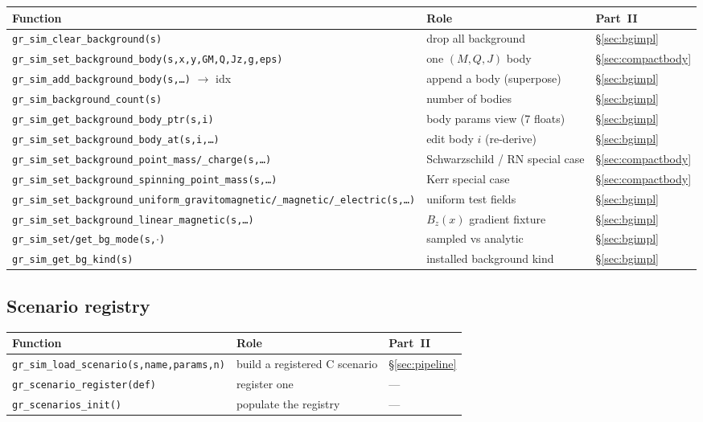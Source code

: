 \documentclass[11pt]{article}
\begin{document}
\nopagebreak
{\footnotesize
\begin{tabular}{@{}F{8.2cm}L{4.9cm}L{1.4cm}@{}}
\toprule
\textbf{Function} & \textbf{Role} & \textbf{Part~II} \\
\midrule
\texttt{gr\_sim\_clear\_background(s)} & drop all background & \S\ref{sec:bgimpl} \\
\texttt{gr\_sim\_set\_background\_body(s,x,y,GM,Q,Jz,g,eps)} & one $(M,Q,J)$ body & \S\ref{sec:compactbody} \\
\texttt{gr\_sim\_add\_background\_body(s,\dots)} $\to$ idx & append a body (superpose) & \S\ref{sec:bgimpl} \\
\texttt{gr\_sim\_background\_count(s)} & number of bodies & \S\ref{sec:bgimpl} \\
\texttt{gr\_sim\_get\_background\_body\_ptr(s,i)} & body params view (7 floats) & \S\ref{sec:bgimpl} \\
\texttt{gr\_sim\_set\_background\_body\_at(s,i,\dots)} & edit body $i$ (re-derive) & \S\ref{sec:bgimpl} \\
\texttt{gr\_sim\_set\_background\_point\_mass/\_charge(s,\dots)} & Schwarzschild / RN special case & \S\ref{sec:compactbody} \\
\texttt{gr\_sim\_set\_background\_spinning\_point\_mass(s,\dots)} & Kerr special case & \S\ref{sec:compactbody} \\
\texttt{gr\_sim\_set\_background\_uniform\_gravitomagnetic/\_magnetic/\_electric(s,\dots)} & uniform test fields & \S\ref{sec:bgimpl} \\
\texttt{gr\_sim\_set\_background\_linear\_magnetic(s,\dots)} & $B_z(x)$ gradient fixture & \S\ref{sec:bgimpl} \\
\texttt{gr\_sim\_set/get\_bg\_mode(s,$\cdot$)} & sampled vs analytic & \S\ref{sec:bgimpl} \\
\texttt{gr\_sim\_get\_bg\_kind(s)} & installed background kind & \S\ref{sec:bgimpl} \\
\bottomrule
\end{tabular}}

\subsection{Scenario registry}
\nopagebreak
{\footnotesize
\begin{tabular}{@{}F{8.2cm}L{4.9cm}L{1.4cm}@{}}
\toprule
\textbf{Function} & \textbf{Role} & \textbf{Part~II} \\
\midrule
\texttt{gr\_sim\_load\_scenario(s,name,params,n)} & build a registered C scenario & \S\ref{sec:pipeline} \\
\texttt{gr\_scenario\_register(def)} & register one & --- \\
\texttt{gr\_scenarios\_init()} & populate the registry & --- \\
\bottomrule
\end{tabular}}
\end{document}
